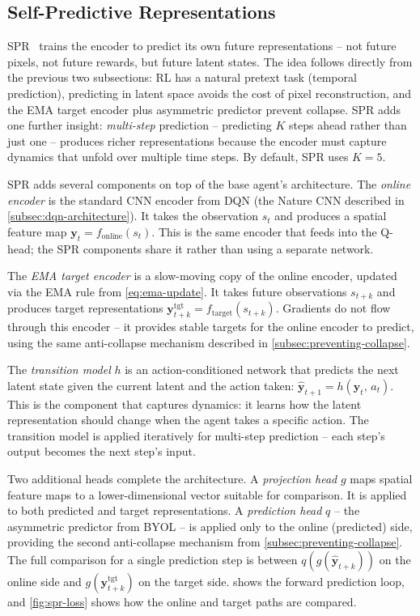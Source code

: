\subsection{Self-Predictive Representations}
\label{subsec:spr}

SPR~\citep{schwarzer2021dataefficient} trains the encoder to
predict its own future representations -- not future pixels, not
future rewards, but future latent states. The idea follows directly
from the previous two subsections: RL has a natural pretext task
(temporal prediction), predicting in latent space avoids the cost of
pixel reconstruction, and the EMA target encoder plus asymmetric
predictor prevent collapse. SPR adds one further insight:
\emph{multi-step} prediction -- predicting $K$ steps ahead rather
than just one -- produces richer representations because the
encoder must capture dynamics that unfold over multiple time steps.
By default, SPR uses $K = 5$.

\smallskip
SPR adds several components on top of the base agent's
architecture. The \emph{online encoder} is the standard CNN
encoder from DQN (the Nature CNN described in
\cref{subsec:dqn-architecture}). It takes the observation $s_t$ and
produces a spatial feature map
$\mathbf{y}_t = f_{\text{online}}(s_t)$. This is the same
encoder that feeds into the Q-head; the SPR components share it
rather than using a separate network.

\smallskip
The \emph{EMA target encoder} is a slow-moving copy of the online
encoder, updated via the EMA rule from \cref{eq:ema-update}. It
takes future observations $s_{t+k}$ and produces target
representations
$\mathbf{y}^{\text{tgt}}_{t+k} = f_{\text{target}}(s_{t+k})$.
Gradients do not flow through this encoder -- it provides stable
targets for the online encoder to predict, using the same
anti-collapse mechanism described in \cref{subsec:preventing-collapse}.

\smallskip
The \emph{transition model} $h$ is an action-conditioned network
that predicts the next latent state given the current latent and
the action taken:
$\hat{\mathbf{y}}_{t+1} = h(\mathbf{y}_t,\, a_t)$. This is the
component that captures dynamics: it learns how the latent
representation should change when the agent takes a specific
action. The transition model is applied iteratively for multi-step
prediction -- each step's output becomes the next step's input.

\smallskip
Two additional heads complete the architecture. A \emph{projection
head} $g$ maps spatial feature maps to a lower-dimensional vector
suitable for comparison. It is applied to both predicted and target
representations. A \emph{prediction head} $q$ -- the asymmetric
predictor from BYOL -- is applied only to the online (predicted)
side, providing the second anti-collapse mechanism from
\cref{subsec:preventing-collapse}. The full comparison for a single
prediction step is between
$q(g(\hat{\mathbf{y}}_{t+k}))$ on the online side and
$g(\mathbf{y}^{\text{tgt}}_{t+k})$ on the target side.
 shows the forward prediction loop, and
\cref{fig:spr-loss} shows how the online and target paths are
compared.

